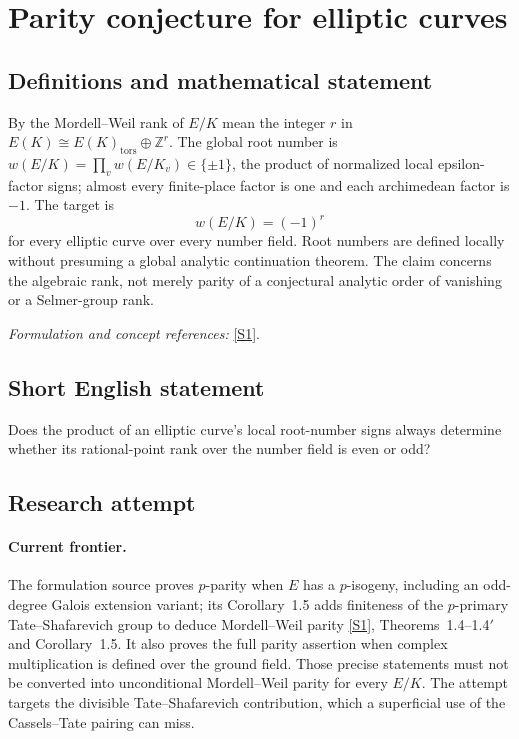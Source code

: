 \documentclass[11pt,a4paper]{article}
\newcommand{\Z}{\mathbb{Z}}
\newcommand{\sref}[2]{\hyperlink{source:#1:#2}{[S#2]}}
\newif\ifshowcatalogue
\newcommand{\cataloguescope}[1]{\ifshowcatalogue
 \paragraph{Exact scope in the supplied catalogue.}
 \begin{quote}\small #1\end{quote}\fi}
\numberwithin{equation}{section}
\begin{document}
\setcounter{section}{0}
\clearpage
\section*{\texorpdfstring{Parity conjecture for elliptic curves}{Parity conjecture for elliptic curves}}\label{statement}
\subsection{Definitions and mathematical statement}
By the Mordell--Weil rank of $E/K$ mean the integer $r$ in
$E(K)\cong E(K)_{\mathrm{tors}}\oplus\Z^r$. The global root number is
$w(E/K)=\prod_v w(E/K_v)\in\{\pm1\}$, the product of normalized local epsilon-factor signs; almost every finite-place factor is one and each archimedean factor is $-1$. The target is
\[
 w(E/K)=(-1)^r
\]
for every elliptic curve over every number field. Root numbers are defined locally without presuming a global analytic continuation theorem. The claim concerns the algebraic rank, not merely parity of a conjectural analytic order of vanishing or a Selmer-group rank.
\par\smallskip\textit{Formulation and concept references:} \sref{statement}{1}.
\cataloguescope{For every number field K and every elliptic curve E/K, is w(E/K)=(-1)\textasciicircum{}rank\_Z E(K), where rank\_Z E(K) is the Mordell-Weil rank and w(E/K)=product\_v w(E/K\_v) is the global root number? The local factors are the usual Weil-Deligne root numbers at finite places, equal to1 at all but finitely many places, and -1 at every archimedean place; their definition does not assume analytic continuation of L(E/K,s).}
\subsection{Short English statement}
Does the product of an elliptic curve's local root-number signs always determine whether its rational-point rank over the number field is even or odd?
\subsection{Research attempt}

\paragraph{Current frontier.}
The formulation source proves $p$-parity when $E$ has a $p$-isogeny, including an odd-degree Galois extension variant; its Corollary~1.5 adds finiteness of the $p$-primary Tate--Shafarevich group to deduce Mordell--Weil parity \sref{statement}{1}, Theorems~1.4--1.4$'$ and Corollary~1.5. It also proves the full parity assertion when complex multiplication is defined over the ground field. Those precise statements must not be converted into unconditional Mordell--Weil parity for every $E/K$. The attempt targets the divisible Tate--Shafarevich contribution, which a superficial use of the Cassels--Tate pairing can miss.
\end{document}
